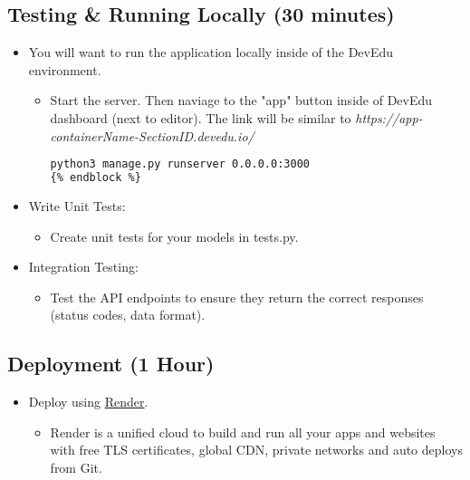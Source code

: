 \documentclass{article}
\begin{document}
\subsection{Testing \& Running Locally (30 minutes)}
\begin{itemize}
    \item You will want to run the application locally inside of the DevEdu environment.
    \begin{itemize}
        \item Start the server. Then naviage to the "app" button inside of DevEdu dashboard (next to editor). The link will be similar to \textit{https://app-containerName-SectionID.devedu.io/}
        \begin{lstlisting}[style=customcode,language=bash]
python3 manage.py runserver 0.0.0.0:3000
{% endblock %}
\end{lstlisting}
    \end{itemize}

    \item Write Unit Tests: 
    \begin{itemize}
        \item Create unit tests for your models in tests.py.
    \end{itemize}
\end{itemize}
\begin{itemize}
    \item Integration Testing: 
    \begin{itemize}
        \item Test the API endpoints to ensure they return the correct responses (status codes, data format).
    \end{itemize}
\end{itemize}

\subsection{Deployment (1 Hour)}
\begin{itemize}
    \item Deploy using \href{https://render.com/docs/deploy-django}{Render}.
     \begin{itemize}
        \item Render is a unified cloud to build and run all your apps and websites with free TLS certificates, global CDN, private networks and auto deploys from Git.
    \end{itemize}
\end{itemize}
\end{document}
